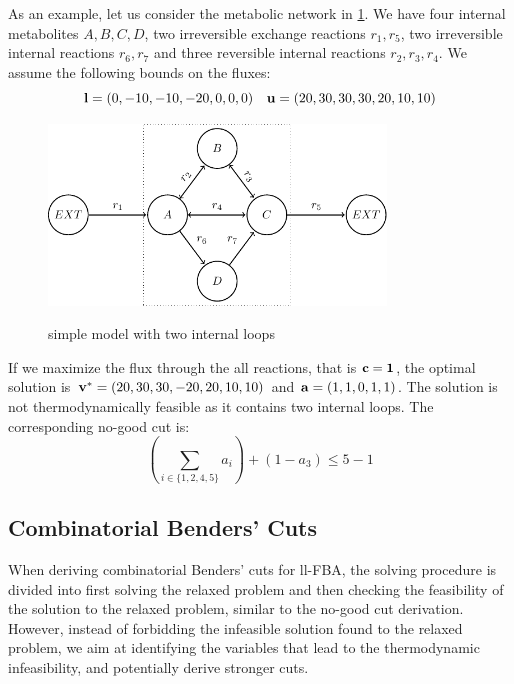 As an example, let us consider the metabolic network in \cref{fig:two_internal_loops}. We have four internal metabolites $A,B,C, D$, two irreversible exchange reactions $r_1, r_5$, two irreversible internal reactions $ r_6, r_7$ and three reversible internal reactions $r_2, r_3, r_4$. We assume the following bounds on the fluxes: 
\begin{equation*} \label{Eq:bounds_loop}
    \bold l = (0,-10,-10,-20,0,0,0) \quad \bold u = (20,30,30,30,20,10,10)
\end{equation*}
\begin{figure}[h!]
    \caption{simple model with two internal loops}
    \centering
    \includegraphics[width=0.8\textwidth]{Images/tikz_graphs_two_loops.pdf}
    \label{fig:two_internal_loops}
\end{figure}
If we maximize the flux through the all reactions, that is $\bold c = \bold 1$, the optimal solution is $\bold v^* = (20, 30, 30, -20, 20, 10, 10)$ and $\bold a = (1,1,0,1,1)$. The solution is not thermodynamically feasible as it contains two internal loops. The corresponding no-good cut is:
\begin{equation*}
    (\sum_{i \in \{1,2,4,5\}} a_i) + (1-a_3) \leq 5-1
\end{equation*}

\subsection{Combinatorial Benders' Cuts} \label{section:cb}
 When deriving combinatorial Benders' cuts for ll-FBA, the solving procedure is divided into first solving the relaxed problem and then checking the feasibility of the solution to the relaxed problem, similar to the no-good cut derivation. However, instead of forbidding the infeasible solution found to the relaxed problem, we aim at identifying the variables that lead to the thermodynamic infeasibility, and potentially derive stronger cuts.

